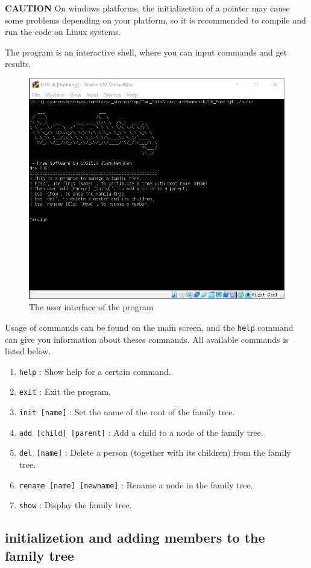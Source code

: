 \documentclass[cn,black,12pt,normal]{elegantnote}
\begin{document}
\textbf{CAUTION} On windows platforms, the initializetion of a pointer may cause some problems depending on your platform, so it is recommended to compile and run the code on Linux systems.

The program is an interactive shell, where you can input commands and get results.

\begin{figure}[H]
    \centering
    \includegraphics[width=0.7\linewidth]{image/f01.jpg}
    \caption{The user interface of the program}
\end{figure}

Usage of commands can be found on the main screen, and the \lstinline{help} command can give you information about theses commands.  All available commands is listed below.

\begin{enumerate}
    \item \lstinline{help} : Show help for a certain command.
    \item \lstinline{exit} : Exit the program.
    \item \lstinline{init [name]} : Set the name of the root of the family tree.
    \item \lstinline{add [child] [parent]} : Add a child to a node of the family tree.
    \item \lstinline{del [name]} : Delete a person (together with its children) from the family tree.
    \item \lstinline{rename [name] [newname]} : Rename a node in the family tree.
    \item \lstinline{show} : Display the family tree.
\end{enumerate}

\subsection{initializetion and adding members to the family tree}
\end{document}
